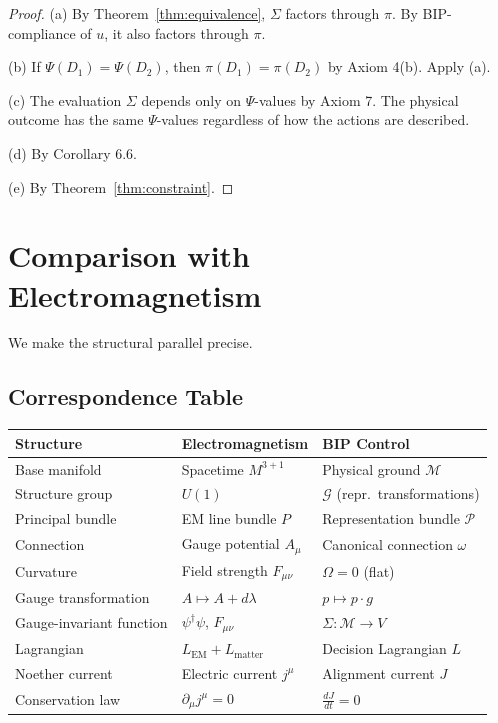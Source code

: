 \documentclass[11pt]{article}
\begin{document}
\begin{proof}
(a) By Theorem~\ref{thm:equivalence}, $\Sigma$ factors through $\pi$. By BIP-compliance of $u$, it also factors through
$\pi$.

(b) If $\Psi(D_1) = \Psi(D_2)$, then $\pi(D_1) = \pi(D_2)$ by Axiom 4(b). Apply (a).

(c) The evaluation $\Sigma$ depends only on $\Psi$-values by Axiom 7. The physical outcome has the
same $\Psi$-values regardless of how the actions are described.

(d) By Corollary 6.6.

(e) By Theorem~\ref{thm:constraint}.
\end{proof}

\section{Comparison with Electromagnetism}

We make the structural parallel precise.

\subsection{Correspondence Table}

\begin{table}[h]
\centering
\begin{tabular}{@{}lll@{}}
\toprule
\textbf{Structure} & \textbf{Electromagnetism} & \textbf{BIP Control} \\
\midrule
Base manifold & Spacetime $M^{3+1}$ & Physical ground $\mathcal{M}$ \\
Structure group & $U(1)$ & $\mathcal{G}$ (repr.\ transformations) \\
Principal bundle & EM line bundle $P$ & Representation bundle $\mathcal{P}$ \\
Connection & Gauge potential $A_\mu$ & Canonical connection $\omega$ \\
Curvature & Field strength $F_{\mu\nu}$ & $\Omega = 0$ (flat) \\
Gauge transformation & $A \mapsto A + d\lambda$ & $p \mapsto p \cdot g$ \\
Gauge-invariant function & $\psi^\dagger\psi$, $F_{\mu\nu}$ & $\Sigma : \mathcal{M} \to V$ \\
Lagrangian & $L_{\mathrm{EM}} + L_{\mathrm{matter}}$ & Decision Lagrangian $L$ \\
Noether current & Electric current $j^\mu$ & Alignment current $J$ \\
Conservation law & $\partial_\mu j^\mu = 0$ & $\frac{dJ}{dt} = 0$ \\
\bottomrule
\end{tabular}
\end{table}
\end{document}
